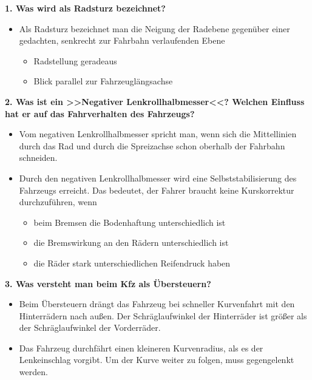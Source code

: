 \textbf{1. Was wird als Radsturz bezeichnet?}

\begin{itemize}
\item
  Als Radsturz bezeichnet man die Neigung der Radebene gegenüber einer
  gedachten, senkrecht zur Fahrbahn verlaufenden Ebene

  \begin{itemize}
  \item
    Radstellung geradeaus
  \item
    Blick parallel zur Fahrzeuglängsachse
  \end{itemize}
\end{itemize}

\textbf{2. Was ist ein >>Negativer Lenkrollhalbmesser<<? Welchen
Einfluss hat er auf das Fahrverhalten des Fahrzeugs?}

\begin{itemize}
\item
  Vom negativen Lenkrollhalbmesser spricht man, wenn sich die
  Mittellinien durch das Rad und durch die Spreizachse schon oberhalb
  der Fahrbahn schneiden.
\item
  Durch den negativen Lenkrollhalbmesser wird eine Selbststabilisierung
  des Fahrzeugs erreicht. Das bedeutet, der Fahrer braucht keine
  Kurskorrektur durchzuführen, wenn

  \begin{itemize}
  \item
    beim Bremsen die Bodenhaftung unterschiedlich ist
  \item
    die Bremswirkung an den Rädern unterschiedlich ist
  \item
    die Räder stark unterschiedlichen Reifendruck haben
  \end{itemize}
\end{itemize}

\textbf{3. Was versteht man beim Kfz als Übersteuern?}

\begin{itemize}
\item
  Beim Übersteuern drängt das Fahrzeug bei schneller Kurvenfahrt mit den
  Hinterrädern nach außen. Der Schräglaufwinkel der Hinterräder ist
  größer als der Schräglaufwinkel der Vorderräder.
\item
  Das Fahrzeug durchfährt einen kleineren Kurvenradius, als es der
  Lenkeinschlag vorgibt. Um der Kurve weiter zu folgen, muss
  gegengelenkt werden.
\end{itemize}

